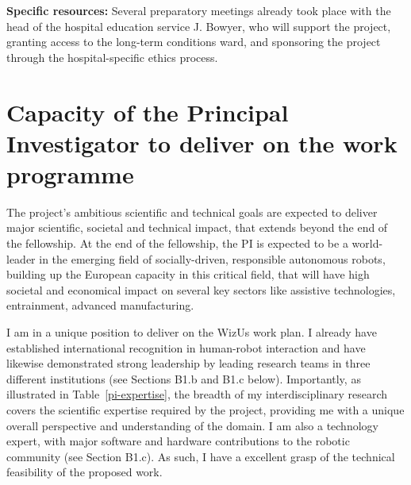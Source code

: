 \documentclass[11pt,a4paper]{report}
\newcommand{\project}{WizUs\xspace}
\begin{document}
\textbf{Specific resources:} Several preparatory meetings already took place
with the head of the hospital education service J. Bowyer, who will support the
project, granting access to the long-term conditions ward, and sponsoring the
project through the hospital-specific ethics process.


\section{Capacity of the Principal Investigator to deliver on the work programme}

The project's ambitious scientific and technical goals are expected to deliver
major scientific, societal and technical impact, that extends beyond the end of
the fellowship. At the end of the fellowship, the PI is expected to be a
world-leader in the emerging field of socially-driven, responsible autonomous
robots, building up the European capacity in this critical
field, that will have high societal and economical impact on several key sectors
like assistive technologies, entrainment, advanced manufacturing.

I am in a unique position to deliver on the \project work plan. I already have
established international recognition in human-robot interaction and have
likewise demonstrated strong leadership by leading research teams in three
different institutions (see Sections B1.b and B1.c below). Importantly, as
illustrated in Table~\ref{pi-expertise}, the breadth of my interdisciplinary
research covers the scientific expertise required by the project, providing me
with a unique overall perspective and understanding of the domain. I am also a
technology expert, with major software and hardware contributions to the robotic
community (see Section B1.c). As such, I have a excellent grasp of the technical
feasibility of the proposed work.
\end{document}
